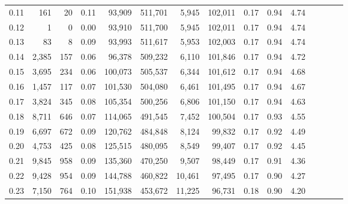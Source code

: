 \begin{tabular}{rrrcrrrrrrrrrrr}
0.11 &     161 &     20 &                                       0.11 &   93,909 &  511,701 &    5,945 &  102,011 &  0.17 &  0.94 &                         4.74 \\
0.12 &       1 &      0 &                                       0.00 &   93,910 &  511,700 &    5,945 &  102,011 &  0.17 &  0.94 &                         4.74 \\
0.13 &      83 &      8 &                                       0.09 &   93,993 &  511,617 &    5,953 &  102,003 &  0.17 &  0.94 &                         4.74 \\
0.14 &   2,385 &    157 &                                       0.06 &   96,378 &  509,232 &    6,110 &  101,846 &  0.17 &  0.94 &                         4.72 \\
0.15 &   3,695 &    234 &                                       0.06 &  100,073 &  505,537 &    6,344 &  101,612 &  0.17 &  0.94 &                         4.68 \\
0.16 &   1,457 &    117 &                                       0.07 &  101,530 &  504,080 &    6,461 &  101,495 &  0.17 &  0.94 &                         4.67 \\
0.17 &   3,824 &    345 &                                       0.08 &  105,354 &  500,256 &    6,806 &  101,150 &  0.17 &  0.94 &                         4.63 \\
0.18 &   8,711 &    646 &                                       0.07 &  114,065 &  491,545 &    7,452 &  100,504 &  0.17 &  0.93 &                         4.55 \\
0.19 &   6,697 &    672 &                                       0.09 &  120,762 &  484,848 &    8,124 &   99,832 &  0.17 &  0.92 &                         4.49 \\
0.20 &   4,753 &    425 &                                       0.08 &  125,515 &  480,095 &    8,549 &   99,407 &  0.17 &  0.92 &                         4.45 \\
0.21 &   9,845 &    958 &                                       0.09 &  135,360 &  470,250 &    9,507 &   98,449 &  0.17 &  0.91 &                         4.36 \\
0.22 &   9,428 &    954 &                                       0.09 &  144,788 &  460,822 &   10,461 &   97,495 &  0.17 &  0.90 &                         4.27 \\
0.23 &   7,150 &    764 &                                       0.10 &  151,938 &  453,672 &   11,225 &   96,731 &  0.18 &  0.90 &                         4.20 \\

\end{tabular}
